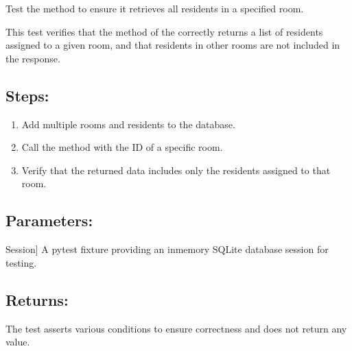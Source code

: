 \documentclass[letterpaper,10pt,english]{sphinxmanual}
\begin{document}

\begin{fulllineitems}
\label{\detokenize{test:test.test_residetnt.test_list_residents_in_room}}
\pysigstartsignatures
\pysiglinewithargsret
{}
{}
{}
\pysigstopsignatures
\sphinxAtStartPar
Test the  method to ensure it retrieves all residents in a specified room.

\sphinxAtStartPar
This test verifies that the  method of the 
correctly returns a list of residents assigned to a given room, and that residents in other rooms
are not included in the response.


\subsection{Steps:}
\label{\detokenize{test:id11}}\begin{enumerate}
%
\item {} 
\sphinxAtStartPar
Add multiple rooms and residents to the database.

\item {} 
\sphinxAtStartPar
Call the  method with the ID of a specific room.

\item {} 
\sphinxAtStartPar
Verify that the returned data includes only the residents assigned to that room.

\end{enumerate}


\subsection{Parameters:}
\label{\detokenize{test:id12}}\begin{description}
\sphinxlineitem{setup\_database}{[}Session{]}
\sphinxAtStartPar
A pytest fixture providing an in\sphinxhyphen{}memory SQLite database session for testing.

\end{description}


\subsection{Returns:}
\label{\detokenize{test:id13}}\begin{description}
\sphinxAtStartPar
The test asserts various conditions to ensure correctness and does not return any value.

\end{description}

\end{fulllineitems}
\end{document}
